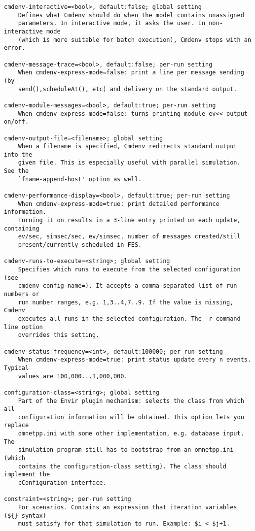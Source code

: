\begin{verbatim}
cmdenv-interactive=<bool>, default:false; global setting
    Defines what Cmdenv should do when the model contains unassigned
    parameters. In interactive mode, it asks the user. In non-interactive mode
    (which is more suitable for batch execution), Cmdenv stops with an error.

cmdenv-message-trace=<bool>, default:false; per-run setting
    When cmdenv-express-mode=false: print a line per message sending (by
    send(),scheduleAt(), etc) and delivery on the standard output.

cmdenv-module-messages=<bool>, default:true; per-run setting
    When cmdenv-express-mode=false: turns printing module ev<< output on/off.

cmdenv-output-file=<filename>; global setting
    When a filename is specified, Cmdenv redirects standard output into the
    given file. This is especially useful with parallel simulation. See the
    `fname-append-host' option as well.

cmdenv-performance-display=<bool>, default:true; per-run setting
    When cmdenv-express-mode=true: print detailed performance information.
    Turning it on results in a 3-line entry printed on each update, containing
    ev/sec, simsec/sec, ev/simsec, number of messages created/still
    present/currently scheduled in FES.

cmdenv-runs-to-execute=<string>; global setting
    Specifies which runs to execute from the selected configuration (see
    cmdenv-config-name=). It accepts a comma-separated list of run numbers or
    run number ranges, e.g. 1,3..4,7..9. If the value is missing, Cmdenv
    executes all runs in the selected configuration. The -r command line option
    overrides this setting.

cmdenv-status-frequency=<int>, default:100000; per-run setting
    When cmdenv-express-mode=true: print status update every n events. Typical
    values are 100,000...1,000,000.

configuration-class=<string>; global setting
    Part of the Envir plugin mechanism: selects the class from which all
    configuration information will be obtained. This option lets you replace
    omnetpp.ini with some other implementation, e.g. database input. The
    simulation program still has to bootstrap from an omnetpp.ini (which
    contains the configuration-class setting). The class should implement the
    cConfiguration interface.

constraint=<string>; per-run setting
    For scenarios. Contains an expression that iteration variables (${} syntax)
    must satisfy for that simulation to run. Example: $i < $j+1.


\end{verbatim}
